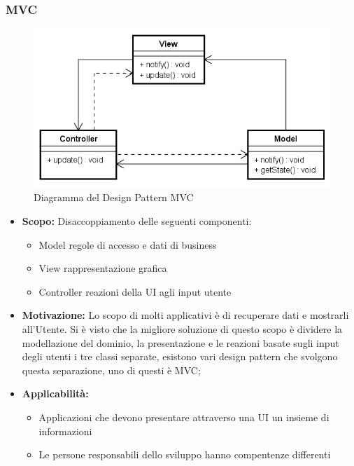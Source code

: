 \documentclass[a4paper]{article}
\begin{document}
	\subsubsection{MVC}
				\begin{figure}[H]
					\centering
					\includegraphics[scale=0.65]{immagini/ST/schemaMVC.png}
					\caption{Diagramma del Design Pattern MVC}
				\end{figure}
            \begin{itemize}
				\item \textbf{Scopo:}
					Disaccoppiamento delle seguenti componenti:
					\begin{itemize}
						\item Model regole di accesso e dati di business
						\item View rappresentazione grafica
						\item Controller reazioni della UI agli input utente
					\end{itemize}
                \item \textbf{Motivazione:}
                	Lo scopo di molti applicativi è di recuperare dati e mostrarli all'Utente. Si è visto che la migliore soluzione di questo scopo è dividere la modellazione del dominio, la presentazione e le reazioni basate sugli input degli utenti i tre classi separate, esistono vari design pattern che svolgono questa separazione, uno di questi è MVC; 
                \item \textbf{Applicabilità:}
					\begin{itemize}
						\item Applicazioni che devono presentare attraverso una UI un insieme di informazioni
						\item Le persone responsabili dello sviluppo hanno compentenze differenti
					\end{itemize}
                	 		
			\end{itemize}
\end{document}
